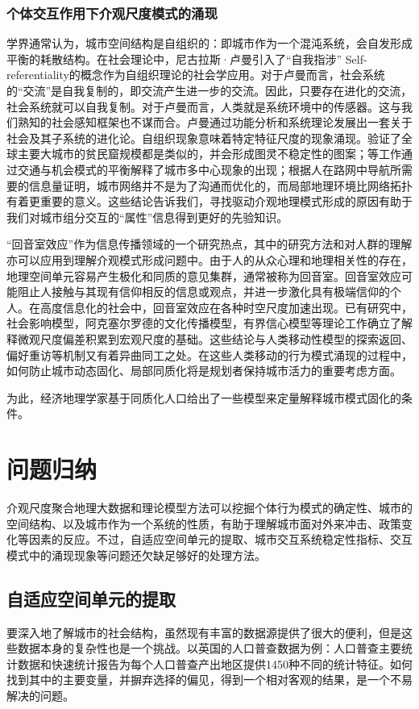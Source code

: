 \subsubsection{个体交互作用下介观尺度模式的涌现}

学界通常认为，城市空间结构是自组织的：即城市作为一个混沌系统，会自发形成平衡的耗散结构。在社会理论中，尼古拉斯·卢曼引入了“自我指涉” Self-referentiality的概念作为自组织理论的社会学应用\cite{luhmann1984soziale}。对于卢曼而言，社会系统的“交流”是自我复制的，即交流产生进一步的交流。因此，只要存在进化的交流，社会系统就可以自我复制。对于卢曼而言，人类就是系统环境中的传感器。这与我们熟知的社会感知框架也不谋而合。卢曼通过功能分析和系统理论发展出一套关于社会及其子系统的进化论。自组织现象意味着特定特征尺度的现象涌现。\cite{friesen2018similar, pelz2019similar}验证了全球主要大城市的贫民窟规模都是类似的，并会形成图灵不稳定性的图案；\cite{louf2013modeling, courtat2011mathematics}等工作通过交通与机会模式的平衡解释了城市多中心现象的出现；\cite{rosvall2005networks}根据人在路网中导航所需要的信息量证明，城市网络并不是为了沟通而优化的，而局部地理环境比网络拓扑有着更重要的意义。这些结论告诉我们，寻找驱动介观地理模式形成的原因有助于我们对城市组分交互的“属性”信息得到更好的先验知识。

“回音室效应”\cite{wang2020public, liu2020modeling}作为信息传播领域的一个研究热点，其中的研究方法和对人群的理解亦可以应用到理解介观模式形成问题中。由于人的从众心理和地理相关性的存在，地理空间单元容易产生极化和同质的意见集群，通常被称为回音室。回音室效应可能阻止人接触与其现有信仰相反的信息或观点，并进一步激化具有极端信仰的个人。在高度信息化的社会中，回音室效应在各种时空尺度加速出现\cite{wang2020public}。已有研究中，社会影响模型\cite{noah2006structural, friedkin2011social, parsegov2016novel}，阿克塞尔罗德的文化传播模型\cite{axelrod1997dissemination}，有界信心模型\cite{deffuant2000mixing}等理论工作确立了解释微观尺度偏差积累到宏观尺度的基础。这些结论与人类移动性模型的探索返回、偏好重访等机制又有着异曲同工之处\cite{song2010modelling, gonzalez2008understanding, brockmann2006scaling}。在这些人类移动的行为模式涌现的过程中，如何防止城市动态固化、局部同质化将是规划者保持城市活力的重要考虑方面。

为此，经济地理学家基于同质化人口给出了一些模型来定量解释城市模式固化的条件。%

\section{问题归纳}

介观尺度聚合地理大数据和理论模型方法可以挖掘个体行为模式的确定性、城市的空间结构、以及城市作为一个系统的性质，有助于理解城市面对外来冲击、政策变化等因素的反应。不过，自适应空间单元的提取、城市交互系统稳定性指标、交互模式中的涌现现象等问题还欠缺足够好的处理方法。

\subsection{自适应空间单元的提取}

要深入地了解城市的社会结构，虽然现有丰富的数据源提供了很大的便利，但是这些数据本身的复杂性也是一个挑战。以英国的人口普查数据为例：人口普查主要统计数据和快速统计报告为每个人口普查产出地区提供1450种不同的统计特征。如何找到其中的主要变量，并摒弃选择的偏见，得到一个相对客观的结果，是一个不易解决的问题。